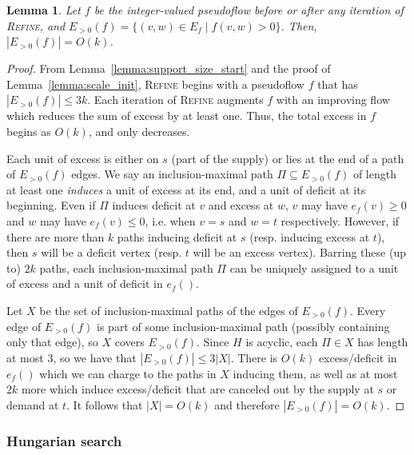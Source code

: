 \documentclass[11pt]{article}
\theoremstyle{plain}
\newtheorem{lemma}{Lemma}[section]
\numberwithin{figure}{section}
\begin{document}
\begin{lemma}
\label{lemma:support_size_during}
Let $f$ be the integer-valued pseudoflow before or after any iteration of
\textsc{Refine}, and $E_{>0}(f) = \{(v, w) \in E_f \mid f(v, w) > 0\}$.
Then, $|E_{>0}(f)| = O(k)$.
\end{lemma}

\begin{proof}
From Lemma~\ref{lemma:support_size_start} and the proof of
Lemma~\ref{lemma:scale_init}, \textsc{Refine} begins with a pseudoflow $f$ that
has $|E_{>0}(f)| \leq 3k$.
Each iteration of \textsc{Refine} augments $f$ with an improving flow which
reduces the sum of excess by at least one.
Thus, the total excess in $f$ begins as $O(k)$, and only decreases.

Each unit of excess is either on $s$ (part of the supply) or lies at the end of
a path of $E_{>0}(f)$ edges.
We say an inclusion-maximal path $\Pi \subseteq E_{>0}(f)$ of length at least
one \emph{induces} a unit of excess at its end, and a unit of deficit at its
beginning.
Even if $\Pi$ induces deficit at $v$ and excess at $w$, $v$ may have
$e_f(v) \geq 0$ and $w$ may have $e_f(v) \leq 0$, i.e. when $v = s$ and $w = t$
respectively.
However, if there are more than $k$ paths inducing deficit at $s$ (resp.
inducing excess at $t$), then $s$ will be a deficit vertex (resp. $t$ will be
an excess vertex).
Barring these (up to) $2k$ paths, each inclusion-maximal path $\Pi$ can be
uniquely assigned to a unit of excess and a unit of deficit in $e_f()$.

Let $X$ be the set of inclusion-maximal paths of the edges of $E_{>0}(f)$.
Every edge of $E_{>0}(f)$ is part of some inclusion-maximal path
(possibly containing only that edge), so $X$ covers $E_{>0}(f)$.
Since $H$ is acyclic, each $\Pi \in X$ has length at most 3, so we have that
$|E_{>0}(f)| \leq 3|X|$.
There is $O(k)$ excess/deficit in $e_f()$ which we can charge to the paths in
$X$ inducing them, as well as at most $2k$ more which induce excess/deficit
that are canceled out by the supply at $s$ or demand at $t$.
It follows that $|X| = O(k)$ and therefore $|E_{>0}(f)| = O(k)$.
\end{proof}


\subsubsection{Hungarian search}
\end{document}
